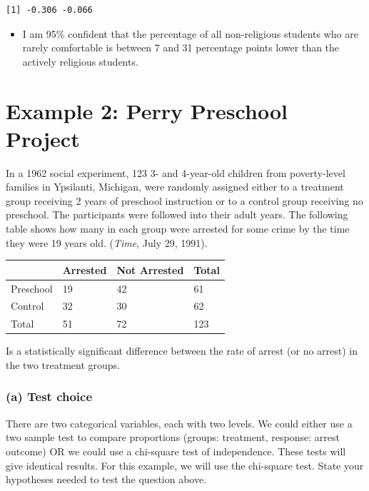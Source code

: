 \documentclass[
]{book}
\providecommand{\tightlist}{%
  \setlength{\itemsep}{0pt}\setlength{\parskip}{0pt}}
\begin{document}
\begin{verbatim}
[1] -0.306 -0.066
\end{verbatim}

\begin{itemize}
\tightlist
\item
  I am 95\% confident that the percentage of all non-religious students who are rarely comfortable is between 7 and 31 percentage points lower than the actively religious students.
\end{itemize}

\hypertarget{example-2-perry-preschool-project}{%
\section{Example 2: Perry Preschool Project}\label{example-2-perry-preschool-project}}

In a 1962 social experiment, 123 3- and 4-year-old children from poverty-level families in Ypsilanti, Michigan, were randomly assigned either to a treatment group receiving 2 years of preschool instruction or to a control group receiving no preschool. The participants were followed into their adult years. The following table shows how many in each group were arrested for some crime by the time they were 19 years old. (\emph{Time}, July 29, 1991).

\begin{longtable}[]{@{}llll@{}}
\toprule()
~ & Arrested & Not Arrested & Total \\
\midrule()
\endhead
Preschool & 19 & 42 & 61 \\
Control & 32 & 30 & 62 \\
Total & 51 & 72 & 123 \\
\bottomrule()
\end{longtable}

Is a statistically significant difference between the rate of arrest (or no arrest) in the two treatment groups.

\hypertarget{a-test-choice}{%
\subsubsection{(a) Test choice}\label{a-test-choice}}

There are two categorical variables, each with two levels. We could either use a two sample test to compare proportions (groups: treatment, response: arrest outcome) OR we could use a chi-square test of independence. These tests will give identical results. For this example, we will use the chi-square test. State your hypotheses needed to test the question above.
\end{document}
